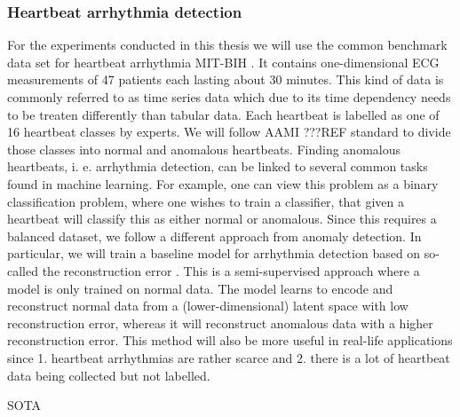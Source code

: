 \subsubsection*{Heartbeat arrhythmia detection}
For the experiments conducted in this thesis we will use the common benchmark data set for heartbeat arrhythmia MIT-BIH \parencite{moody2001impact}. It contains one-dimensional ECG measurements of 47 patients each lasting about 30 minutes. This kind of data is commonly referred to as time series data which due to its time dependency needs to be treaten differently than tabular data. Each heartbeat is labelled as one of 16 heartbeat classes by experts. We will follow AAMI ???REF standard to divide those classes into normal and anomalous heartbeats. Finding anomalous heartbeats, i. e. arrhythmia detection, can be linked to several common tasks found in machine learning. For example, one can view this problem as a binary classification problem, where one wishes to train a classifier, that given a heartbeat will classify this as either normal or anomalous. Since this requires a balanced dataset, we follow a different approach from anomaly detection. In particular, we will train a baseline model for arrhythmia detection based on so-called the reconstruction error \parencite[see][for an in-depth survey on anomaly detection with times series]{schmidl2022anomaly}. This is a semi-supervised approach where a model is only trained on normal data. The model learns to encode and reconstruct normal data from a (lower-dimensional) latent space with low reconstruction error, whereas it will reconstruct anomalous data with a higher reconstruction error. This method will also be more useful in real-life applications since 1. heartbeat arrhythmias are rather scarce and 2. there is a lot of heartbeat data being collected but not labelled.

SOTA

